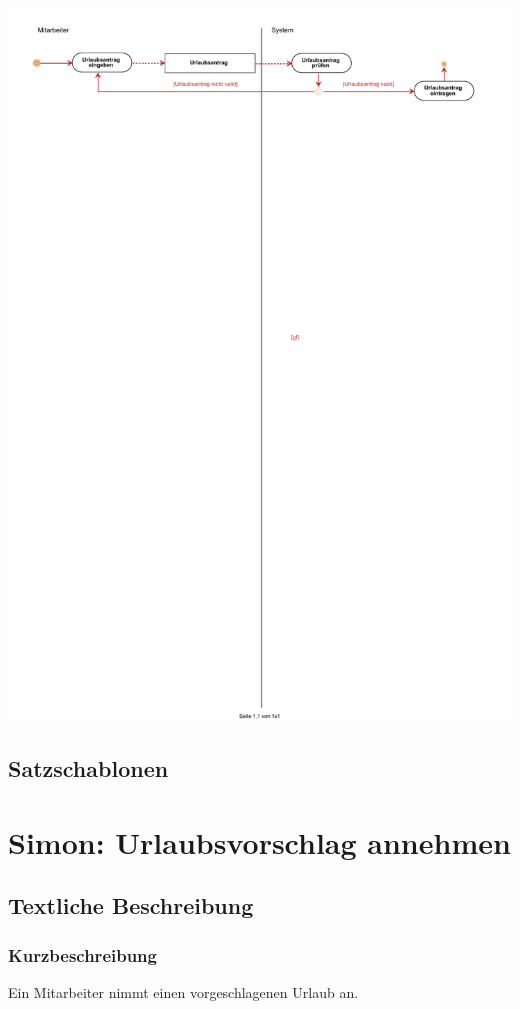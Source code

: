 \begin{center}
	\includegraphics[width=0.9\linewidth]{Urlaub_einreichen.pdf}
\end{center}

\subsection{Satzschablonen}

\section{Simon: Urlaubsvorschlag annehmen}

\subsection{Textliche Beschreibung}

\subsubsection{Kurzbeschreibung}
Ein Mitarbeiter nimmt einen vorgeschlagenen Urlaub an.

